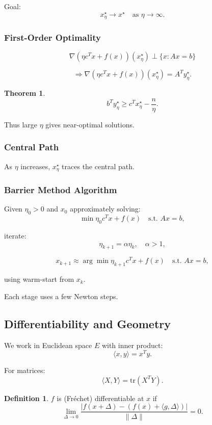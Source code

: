 \documentclass[12pt,oneside]{book}
\numberwithin{equation}{section}
\theoremstyle{definition}
\newtheorem{definition}{Definition}[section]
\theoremstyle{plain}
\newtheorem{theorem}{Theorem}[section]
\theoremstyle{remark}
\begin{document}
Goal:
\[
x_\eta^\star \to x^\star \quad \text{as } \eta \to \infty.
\]

\subsubsection*{First-Order Optimality}

\[
\nabla(\eta c^T x + f(x))(x_\eta^\star)
\perp \{x : Ax = b\}
\]

\[
\Rightarrow
\nabla(\eta c^T x + f(x))(x_\eta^\star)
= A^T y_\eta^\star.
\]

\begin{theorem}
\[
b^T y_\eta^\star \ge c^T x_\eta^\star - \frac{n}{\eta}.
\]
\end{theorem}

\noindent
Thus large $\eta$ gives near-optimal solutions.

\subsubsection*{Central Path}

As $\eta$ increases, $x_\eta^\star$ traces the central path.

\subsubsection*{Barrier Method Algorithm}

Given $\eta_0 > 0$ and $x_0$ approximately solving:
\[
\min \eta_0 c^T x + f(x)
\quad \text{s.t. } Ax = b,
\]

iterate:
\[
\eta_{k+1} = \alpha \eta_k, \quad \alpha > 1,
\]

\[
x_{k+1} \approx \arg\min \eta_{k+1} c^T x + f(x)
\quad \text{s.t. } Ax = b,
\]

using warm-start from $x_k$.

Each stage uses a few Newton steps.

\subsection*{Differentiability and Geometry}

We work in Euclidean space $E$ with inner product:
\[
\langle x,y \rangle = x^T y.
\]

For matrices:
\[
\langle X,Y \rangle = \mathrm{tr}(X^T Y).
\]

\begin{definition}
$f$ is (Fréchet) differentiable at $x$ if
\[
\lim_{\Delta \to 0}
\frac{|f(x+\Delta) - (f(x) + \langle g,\Delta \rangle)|}{\|\Delta\|} = 0.
\]
\end{definition}
\end{document}
